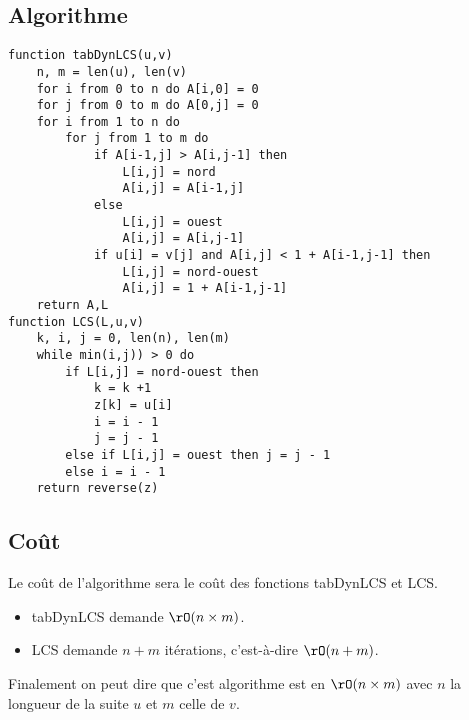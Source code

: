 \documentclass{mybourbaki}
\begin{document}

\subsection{Algorithme}

\begin{lstlisting}
function tabDynLCS(u,v)
	n, m = len(u), len(v)
	for i from 0 to n do A[i,0] = 0
	for j from 0 to m do A[0,j] = 0
	for i from 1 to n do
		for j from 1 to m do
			if A[i-1,j] > A[i,j-1] then
				L[i,j] = nord
				A[i,j] = A[i-1,j]
			else 
				L[i,j] = ouest
				A[i,j] = A[i,j-1]
			if u[i] = v[j] and A[i,j] < 1 + A[i-1,j-1] then
				L[i,j] = nord-ouest
				A[i,j] = 1 + A[i-1,j-1]
	return A,L
function LCS(L,u,v)
	k, i, j = 0, len(n), len(m)
	while min(i,j)) > 0 do
		if L[i,j] = nord-ouest then
			k = k +1
			z[k] = u[i]
			i = i - 1
			j = j - 1 
		else if L[i,j] = ouest then j = j - 1
		else i = i - 1
	return reverse(z)					
\end{lstlisting}

\subsection{Coût}

Le coût de l'algorithme sera le coût des fonctions tabDynLCS et LCS.
\begin{itemize}
\item tabDynLCS demande $\rO(n\times m)$.
\item LCS demande $n+m$ itérations, c'est-à-dire $\rO(n+m)$.
\end{itemize}
Finalement on peut dire que c'est algorithme est en $\rO(n\times m)$ avec $n$ la longueur de la suite $u$ et $m$ celle de $v$.
\end{document}
